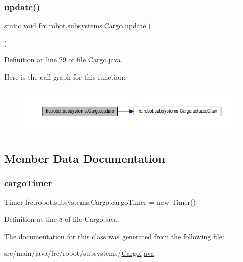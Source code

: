 \subsubsection{\texorpdfstring{update()}{update()}}
{\footnotesize\ttfamily static void frc.\+robot.\+subsystems.\+Cargo.\+update (\begin{DoxyParamCaption}{ }\end{DoxyParamCaption})\hspace{0.3cm}{\ttfamily [static]}}



Definition at line 29 of file Cargo.\+java.

Here is the call graph for this function\+:\nopagebreak
\begin{figure}[H]
\begin{center}
\leavevmode
\includegraphics[width=350pt]{d6/dae/classfrc_1_1robot_1_1subsystems_1_1_cargo_a20e8230acdc07d7d94e056f9e09d91ad_cgraph}
\end{center}
\end{figure}


\subsection{Member Data Documentation}
\mbox{\label{classfrc_1_1robot_1_1subsystems_1_1_cargo_a50722902fa0c3ad0db5f592ad51b94f6}} 
\subsubsection{\texorpdfstring{cargo\+Timer}{cargoTimer}}
{\footnotesize\ttfamily Timer frc.\+robot.\+subsystems.\+Cargo.\+cargo\+Timer = new Timer()\hspace{0.3cm}{\ttfamily [static]}}



Definition at line 8 of file Cargo.\+java.



The documentation for this class was generated from the following file\+:\begin{DoxyCompactItemize}
\item 
src/main/java/frc/robot/subsystems/\hyperlink{_cargo_8java}{Cargo.\+java}\end{DoxyCompactItemize}

